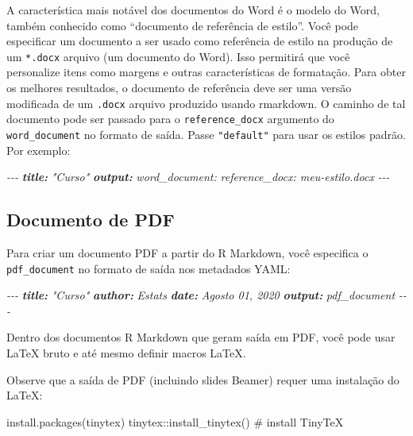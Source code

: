 \documentclass[
]{book}
\newenvironment{Shaded}{\begin{snugshade}}{\end{snugshade}}
\newcommand{\AnnotationTok}[1]{\textcolor[rgb]{0.56,0.35,0.01}{\textbf{\textit{#1}}}}
\newcommand{\CommentTok}[1]{\textcolor[rgb]{0.56,0.35,0.01}{\textit{#1}}}
\newcommand{\NormalTok}[1]{#1}
\begin{document}
A característica mais notável dos documentos do Word é o modelo do Word, também conhecido como ``documento de referência de estilo''. Você pode especificar um documento a ser usado como referência de estilo na produção de um \texttt{*.docx} arquivo (um documento do Word). Isso permitirá que você personalize itens como margens e outras características de formatação. Para obter os melhores resultados, o documento de referência deve ser uma versão modificada de um \texttt{.docx} arquivo produzido usando rmarkdown. O caminho de tal documento pode ser passado para o \texttt{reference\_docx} argumento do \texttt{word\_document} no formato de saída. Passe \texttt{"default"} para usar os estilos padrão. Por exemplo:

\begin{Shaded}
\begin{Highlighting}[]
\CommentTok{{-}{-}{-}}
\AnnotationTok{title:}\CommentTok{ "Curso"}
\AnnotationTok{output:}
\CommentTok{  word\_document:}
\CommentTok{    reference\_docx: meu{-}estilo.docx}
\CommentTok{{-}{-}{-}}
\end{Highlighting}
\end{Shaded}

\hypertarget{documento-de-pdf}{%
\subsection{Documento de PDF}\label{documento-de-pdf}}

Para criar um documento PDF a partir do R Markdown, você especifica o \texttt{pdf\_document} no formato de saída nos metadados YAML:

\begin{Shaded}
\begin{Highlighting}[]
\CommentTok{{-}{-}{-}}
\AnnotationTok{title:}\CommentTok{ "Curso"}
\AnnotationTok{author:}\CommentTok{ Estats}
\AnnotationTok{date:}\CommentTok{ Agosto 01, 2020}
\AnnotationTok{output:}\CommentTok{ pdf\_document}
\CommentTok{{-}{-}{-}}
\end{Highlighting}
\end{Shaded}

Dentro dos documentos R Markdown que geram saída em PDF, você pode usar LaTeX bruto e até mesmo definir macros LaTeX.

Observe que a saída de PDF (incluindo slides Beamer) requer uma instalação do LaTeX:

\begin{Shaded}
\begin{Highlighting}[]
\NormalTok{install.packages(\textquotesingle{}tinytex\textquotesingle{})}
\NormalTok{tinytex::install\_tinytex()  \# install TinyTeX}
\end{Highlighting}
\end{Shaded}
\end{document}
